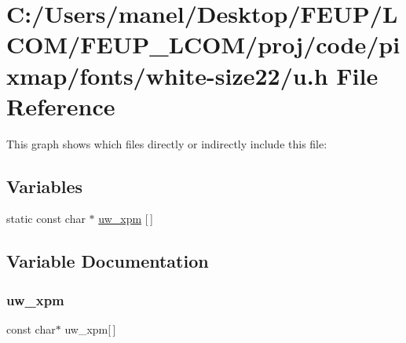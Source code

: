 \hypertarget{white-size22_2u_8h}{}\section{C\+:/\+Users/manel/\+Desktop/\+F\+E\+U\+P/\+L\+C\+O\+M/\+F\+E\+U\+P\+\_\+\+L\+C\+O\+M/proj/code/pixmap/fonts/white-\/size22/u.h File Reference}
\label{white-size22_2u_8h}
This graph shows which files directly or indirectly include this file\+:
\subsection*{Variables}
\begin{DoxyCompactItemize}
\item 
static const char $\ast$ \mbox{\hyperlink{white-size22_2u_8h_a7cf6873107ca6a2d471e86cd21784a10}{uw\+\_\+xpm}} \mbox{[}$\,$\mbox{]}
\end{DoxyCompactItemize}


\subsection{Variable Documentation}
\mbox{\label{white-size22_2u_8h_a7cf6873107ca6a2d471e86cd21784a10}} 
\subsubsection{\texorpdfstring{uw\_xpm}{uw\_xpm}}
{\footnotesize\ttfamily const char$\ast$ uw\+\_\+xpm\mbox{[}$\,$\mbox{]}\hspace{0.3cm}{\ttfamily [static]}}

